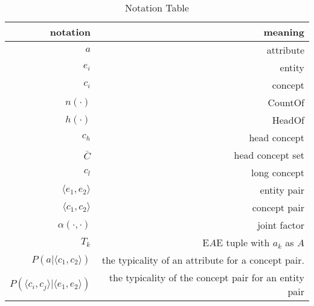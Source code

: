 \begin{table}[htbp]
  \centering
     \small
  \caption{Notation Table}
    \begin{tabular}{rr}
    \toprule
    notation & meaning \\
    \midrule
    $a$     & attribute \\
    $e_i$  & entity \\
    $c_i$  & concept \\
    $n(\cdot)$  & CountOf \\
    $h(\cdot)$ & HeadOf \\
    $c_h$  & head concept \\
    $\bar{C}$ &  head concept set\\
    $c_l$  & long concept \\
    $\langle e_1,e_2 \rangle$ & entity pair\\
    $\langle c_1,c_2 \rangle$ & concept pair\\
    $\alpha(\cdot,\cdot)$ & joint factor\\
    $T_k$ & E$A$E tuple with $a_k$ as $A$\\
   $P(a| \langle c_{1},c_{2} \rangle )$ &  the typicality of an attribute for a concept pair.\\
 $P( \langle c_{i},c_{j} \rangle | \langle e_{1},e_{2} \rangle )$ & the typicality of the concept pair for an entity pair\\
    \bottomrule
    \end{tabular}%
  \label{tab:notation}%
\end{table}%


